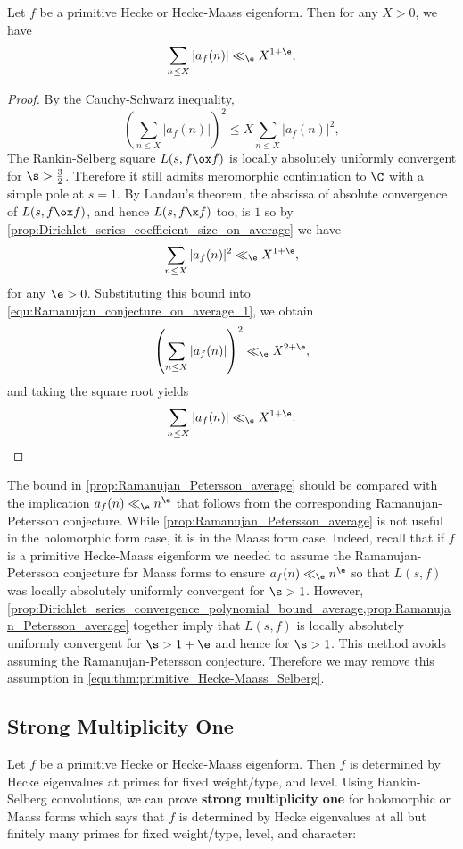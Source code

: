      \begin{proposition}\label{prop:Ramanujan_Petersson_average}
        Let $f$ be a primitive Hecke or Hecke-Maass eigenform. Then for any $X > 0$, we have
        \[
        \sum_{n \le X}|a_{f}(n)| \ll_{\e} X^{1+\e},
        \]
      \end{proposition}
      \begin{proof}
        By the Cauchy-Schwarz inequality,
        \begin{equation}\label{equ:Ramanujan_conjecture_on_average_1}
          \left(\sum_{n \le X}|a_{f}(n)|\right)^{2} \le X\sum_{n \le X}|a_{f}(n)|^{2},
        \end{equation}
        The Rankin-Selberg square $L(s,f \ox f)$ is locally absolutely uniformly convergent for $\s > \frac{3}{2}$. Therefore it still admits meromorphic continuation to $\C$ with a simple pole at $s = 1$. By Landau's theorem, the abscissa of absolute convergence of $L(s,f \ox f)$, and hence $L(s,f \x f)$ too, is $1$ so by \cref{prop:Dirichlet_series_coefficient_size_on_average} we have
        \[
          \sum_{n \le X}|a_{f}(n)|^{2} \ll_{\e} X^{1+\e},
        \]
        for any $\e > 0$. Substituting this bound into \cref{equ:Ramanujan_conjecture_on_average_1}, we obtain
        \[
          \left(\sum_{n \le X}|a_{f}(n)|\right)^{2} \ll_{\e} X^{2+\e},
        \]
        and taking the square root yields
        \[
          \sum_{n \le X}|a_{f}(n)| \ll_{\e} X^{1+\e}.
        \]
      \end{proof}
      
      The bound in \cref{prop:Ramanujan_Petersson_average} should be compared with the implication $a_{f}(n) \ll_{\e} n^{\e}$ that follows from the corresponding Ramanujan-Petersson conjecture. While \cref{prop:Ramanujan_Petersson_average} is not useful in the holomorphic form case, it is in the Maass form case. Indeed, recall that if $f$ is a primitive Hecke-Maass eigenform we needed to assume the Ramanujan-Petersson conjecture for Maass forms to ensure $a_{f}(n) \ll_{\e} n^{\e}$ so that $L(s,f)$ was locally absolutely uniformly convergent for $\s > 1$. However, \cref{prop:Dirichlet_series_convergence_polynomial_bound_average,prop:Ramanujan_Petersson_average} together imply that $L(s,f)$ is locally absolutely uniformly convergent for $\s > 1+\e$ and hence for $\s > 1$. This method avoids assuming the Ramanujan-Petersson conjecture. Therefore we may remove this assumption in \cref{equ:thm:primitive_Hecke-Maass_Selberg}.
    \subsection*{Strong Multiplicity One}
      Let $f$ be a primitive Hecke or Hecke-Maass eigenform. Then $f$ is determined by Hecke eigenvalues at primes for fixed weight/type, and level. Using Rankin-Selberg convolutions, we can prove \textbf{strong multiplicity one} for holomorphic or Maass forms which says that $f$ is determined by Hecke eigenvalues at all but finitely many primes for fixed weight/type, level, and character:

